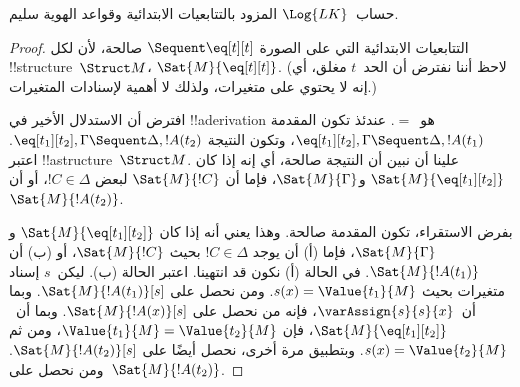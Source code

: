 \documentclass[../../../include/open-logic-section]{subfiles}
\begin{document}


\begin{prop}
حساب~$\Log{LK}$ المزود بالتتابعيات الابتدائية وقواعد الهوية سليم.
\end{prop}

\begin{proof}
التتابعيات الابتدائية التي على الصورة ${} \Sequent \eq[t][t]$ صالحة،
لأن لكل !!{structure}~$\Struct M$، $\Sat{M}{\eq[t][t]}$. (لاحظ أننا
نفترض أن الحد~$t$ مغلق، أي إنه لا يحتوي على متغيرات، ولذلك لا أهمية
لإسنادات المتغيرات.)

افترض أن الاستدلال الأخير في !!a{derivation} هو~$=$. عندئذ تكون المقدمة
$\eq[t_1][t_2], \Gamma \Sequent \Delta, !A(t_1)$، وتكون النتيجة
$\eq[t_1][t_2], \Gamma \Sequent \Delta, !A(t_2)$. اعتبر
!!a{structure}~$\Struct M$. علينا أن نبين أن النتيجة صالحة، أي إنه إذا
كان $\Sat{M}{\eq[t_1][t_2]}$ و$\Sat{M}{\Gamma}$، فإما أن
$\Sat{M}{!C}$ لبعض $!C \in \Delta$، أو أن $\Sat{M}{!A(t_2)}$.

بفرض الاستقراء، تكون المقدمة صالحة. وهذا يعني أنه إذا كان
$\Sat{M}{\eq[t_1][t_2]}$ و$\Sat{M}{\Gamma}$، فإما (أ) أن يوجد
$!C \in \Delta$ بحيث $\Sat{M}{!C}$، أو (ب) أن
$\Sat{M}{!A(t_1)}$. في الحالة (أ) نكون قد انتهينا. اعتبر الحالة (ب).
ليكن~$s$ إسناد متغيرات بحيث $s(x) = \Value{t_1}{M}$. ومن
 نحصل على
$\Sat{M}{!A(t_1)}[s]$. وبما أن~$\varAssign{s}{s}{x}$، فإنه من
 نحصل على
$\Sat{M}{!A(x)}[s]$. وبما أن~$\Sat{M}{\eq[t_1][t_2]}$، فإن
$\Value{t_1}{M} = \Value{t_2}{M}$، ومن ثم
$s(x) = \Value{t_2}{M}$. وبتطبيق
 مرة أخرى، نحصل أيضًا على
$\Sat{M}{!A(t_2)}[s]$. ومن 
نحصل على~$\Sat{M}{!A(t_2)}$.
\end{proof}
\end{document}
